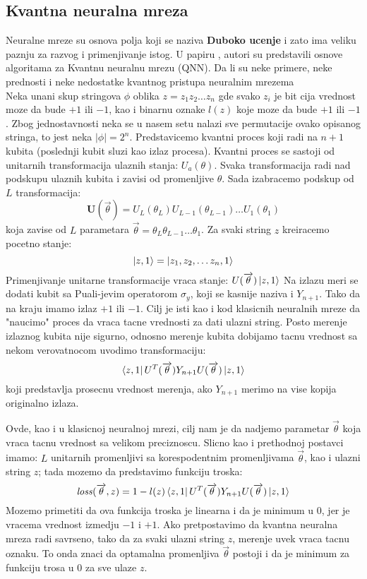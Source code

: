 \documentclass[12pt, letterpaper, oneside]{article}
\begin{document}
\subsection{Kvantna neuralna mreza}
Neuralne mreze su osnova polja koji se naziva \textbf{Duboko ucenje} i zato ima veliku paznju za razvog i primenjivanje istog.
U papiru \cite{Classification_wit_QNN}, autori su predstavili osnove algoritama za Kvantnu neuralnu mrezu (QNN).
Da li su neke primere, neke prednosti i neke nedostatke kvantnog pristupa neuralnim mrezema\\

Neka unani skup stringova $\phi$ oblika $z=z_1 z_2 \dots z_n$ gde svako $z_i$ je bit cija vrednost moze da bude $+1$ ili $-1$,
kao i binarnu oznake $l(z)$ koje moze da bude $+1$ ili $-1$. Zbog jednostavnosti neka se u nasem setu nalazi sve permutacije 
ovako opisanog stringa, to jest neka $|\phi|=2^n$.
Predstavicemo kvantni proces koji radi na $n+1$ kubita (poslednji kubit sluzi kao izlaz procesa). Kvantni proces se sastoji od 
unitarnih transformacija ulaznih stanja: ${U_a(\theta)}$.
Svaka transformacija radi nad podskupu ulaznih kubita i zavisi od promenljive $\theta$.
Sada izabracemo podskup od $L$ transformacija:
\[
  \mathbf{U}(\overrightarrow{\theta}) = U_{L}(\theta_{L}) U_{L-1}(\theta_{L-1}) \dots U_{1}(\theta_{1}) 
\]
koja zavise od $L$ parametara $\overrightarrow{\theta}=\theta_{L} \theta_{L-1} \dots \theta_{1}$.
Za svaki string $z$ kreiracemo pocetno stanje:
\[
    \Ket{z,1} = \Ket{z_1, z_2, \dots z_n, 1}
\]
Primenjivanje unitarne transformacije vraca stanje: $U(\overrightarrow{\theta})\Ket{z,1}$
Na izlazu meri se dodati kubit sa Puali-jevim operatorom $\sigma_y$, koji se kasnije naziva i $Y_{n+1}$.
Tako da na kraju imamo izlaz $+1$ ili $-1$. Cilj je isti kao i kod klasicnih neuralnih mreze da "naucimo" proces da vraca
tacne vrednosti za dati ulazni string. Posto merenje izlaznog kubita nije sigurno, odnosno merenje kubita dobijamo tacnu vrednost 
sa nekom verovatnocom uvodimo transformaciju:
\[
    \bra{z,1}U^T(\overrightarrow{\theta})Y_{n+1}U(\overrightarrow{\theta})\Ket{z,1}
\]
koji predstavlja prosecnu vrednost merenja, ako $Y_{n+1}$ merimo na vise kopija originalno izlaza. 

Ovde, kao i u klasicnoj neuralnoj mrezi, cilj nam je da nadjemo parametar $\overrightarrow{\theta}$ koja vraca tacnu vrednost sa velikom preciznoscu.
Slicno kao i prethodnoj postavci imamo: $L$ unitarnih promenljivi sa korespodentnim promenljivama $\overrightarrow{\theta}$, kao i ulazni string $z$; 
tada mozemo da predstavimo funkciju troska:
\[
    \mathit{loss}(\overrightarrow{\theta},z) = 1 - l(z)\bra{z,1}U^T(\overrightarrow{\theta})Y_{n+1}U(\overrightarrow{\theta})\Ket{z,1}
\]
Mozemo primetiti da ova funkcija troska je linearna i da je minimum u $0$, jer je vracema vrednost izmedju $-1$ i $+1$.
Ako pretpostavimo da kvantna neuralna mreza radi savrseno, tako da za svaki ulazni string $z$, merenje uvek vraca tacnu oznaku.
To onda znaci da optamalna promenljiva $\overrightarrow{\theta}$ postoji i da je minimum za funkciju trosa u $0$ za sve ulaze $z$.
\end{document}
